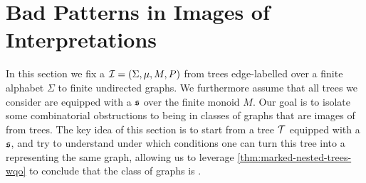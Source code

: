\section{Bad Patterns in Images of Interpretations}
\label{sec:bad-patterns}

In this section we fix a  $\mathcal{I} = (\Sigma,
\mu, M, P)$ from trees edge-labelled over a finite alphabet $\Sigma$ to finite
undirected graphs. We furthermore assume that all trees we consider are
equipped with a  $\mathfrak{s}$ over the finite monoid $M$. Our
goal is to isolate some combinatorial obstructions to being
 in classes of graphs that are images of  from trees. The key idea of this section is to start from a
tree $\t$ equipped with a  $\mathfrak{s}$, and try to
understand under which conditions one can turn this tree into a  representing the same graph, allowing us to leverage
\cref{thm:marked-nested-trees-wqo} to conclude that the class of graphs is
.


